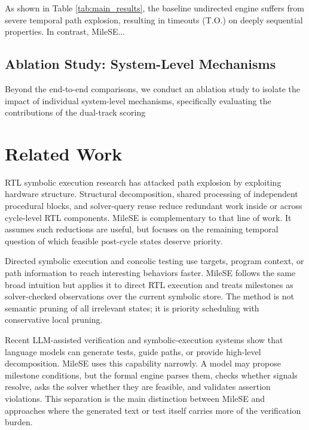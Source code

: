 \documentclass[conference]{IEEEtran}
\begin{document}
As shown in Table \ref{tab:main_results}, the baseline undirected engine suffers from severe temporal path explosion, resulting in timeouts (T.O.) on deeply sequential properties. In contrast, MileSE... 


\subsection{Ablation Study: System-Level Mechanisms}
\label{subsec:eval_ablation}
Beyond the end-to-end comparisons, we conduct an ablation study to isolate the impact of individual system-level mechanisms, specifically evaluating the contributions of the dual-track scoring

\section{Related Work}
\label{sec:related}
RTL symbolic execution research has attacked path explosion by exploiting hardware structure. Structural decomposition, shared processing of independent procedural blocks, and solver-query reuse reduce redundant work inside or across cycle-level RTL components. MileSE is complementary to that line of work. It assumes such reductions are useful, but focuses on the remaining temporal question of which feasible post-cycle states deserve priority.

Directed symbolic execution and concolic testing use targets, program context, or path information to reach interesting behaviors faster. MileSE follows the same broad intuition but applies it to direct RTL execution and treats milestones as solver-checked observations over the current symbolic store. The method is not semantic pruning of all irrelevant states; it is priority scheduling with conservative local pruning.

Recent LLM-assisted verification and symbolic-execution systems show that language models can generate tests, guide paths, or provide high-level decomposition. MileSE uses this capability narrowly. A model may propose milestone conditions, but the formal engine parses them, checks whether signals resolve, asks the solver whether they are feasible, and validates assertion violations. This separation is the main distinction between MileSE and approaches where the generated text or test itself carries more of the verification burden.
\end{document}
